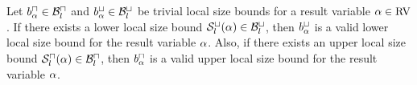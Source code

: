 \begin{theorem}
  Let $b^\sqcap_\alpha \in \mathcal{B}^\sqcap_l$ and $b^\sqcup_\alpha \in \mathcal{B}^\sqcup_l$ be trivial local size bounds for a result variable $\alpha \in \text{RV}$.
  If there exists a lower local size bound ${\mathcal{S}^\sqcup_l}(\alpha) \in \mathcal{B}^\sqcup_l$, then $b^\sqcup_\alpha$ is a valid lower local size bound for the result variable $\alpha$.
  Also, if there exists an upper local size bound ${\mathcal{S}^\sqcap_l}(\alpha) \in \mathcal{B}^\sqcap_l$, then $b^\sqcap_\alpha$ is a valid upper local size bound for the result variable $\alpha$.
\end{theorem}
